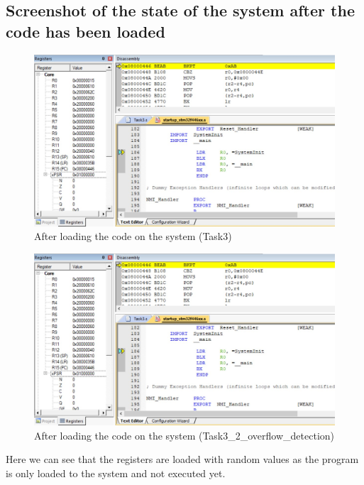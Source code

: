 \documentclass[footheight=20pt, footsepline, headheight=20pt, headsepline]{scrartcl}
\begin{document}
\FloatBarrier
\subsection*{Screenshot of the state of the system after the code has been loaded}
\begin{figure}[ht]
    \centering
    \includegraphics[scale=.7]{images/Task3_1Before1.jpg}
    \caption{After loading the code on the system (Task3)}
    \label{fig:before_task_three_one}
\end{figure}
\FloatBarrier
\begin{figure}[ht]
    \centering
    \includegraphics[scale=.7]{images/Task3_1Before1.jpg}
    \caption{After loading the code on the system (Task3\_2\_overflow\_detection)}
    \label{fig:before_task_three_two}
\end{figure}
\FloatBarrier

Here we can see that the registers are loaded with random values as the program is only loaded to the system and not executed yet.
\end{document}
